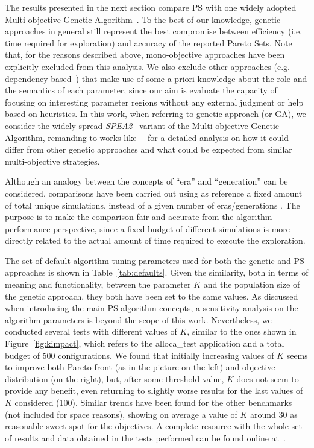 The results presented in the next section compare PS with one widely
adopted Multi-objective Genetic Algorithm~\cite{knowles_techrep06}. To
the best of our knowledge, genetic approaches in general still
represent the best compromise between efficiency (i.e. time required
for exploration) and accuracy of the reported Pareto Sets.  Note that,
for the reasons described above, mono-objective approaches have been
explicitly excluded from this analysis.  We also exclude other
approaches (e.g.  dependency based~\cite{givargis_tvlsi02}) that make
use of some a-priori knowledge about the role and the semantics of each
parameter, since our aim is evaluate the capacity of focusing on
interesting parameter regions without any external judgment or help
based on heuristics.  In this work, when referring to
genetic approach (or GA), we consider the widely spread 
\emph{SPEA2}~\cite{zitzler_eurogen01} variant of the Multi-objective
Genetic Algorithm, remanding to
works like~\cite{zitzler_ec00}~\cite{zitzler_tec03} for a detailed
analysis on how it could differ from other genetic approaches and what
could be expected from similar multi-objective strategies. 

Although an analogy between the concepts of ``era'' and ``generation''
can be considered, comparisons have been carried out using as
reference a fixed amount of total unique simulations, instead of a given
number of eras/generations . The purpose is to make the comparison
fair and accurate from the algorithm performance perspective, since a fixed budget of
different simulations is more directly related to the actual amount of time
required to execute the exploration.

The set of default algorithm tuning parameters used for both the
genetic and PS approaches is shown in
Table~\ref{tab:defaults}. Given the similarity, both in terms of
meaning and functionality, between the parameter $K$ and the population size
of the genetic approach, they both have been set to the same values. As discussed
when introducing the main PS algorithm concepts, a sensitivity analysis on the algorithm parameters is beyond the scope of this work. Nevertheless, we conducted several tests with
different values of $K$, similar to the ones shown in
Figure~\ref{fig:kimpact}, which refers to the alloca\_test application
and a total budget of 500 configurations. We found that initially increasing values
of $K$ seems to improve both Pareto front (as in the picture on the left) and objective
distribution (on the right), but, after some threshold value, $K$ does
not seem to provide any benefit, even returning to slightly worse
results for the last values of $K$ considered (100). Similar trends have been
found for the other benchmarks (not included for space reasons),
showing on average a value of $K$ around 30 as
reasonable sweet spot for the objectives. A complete resource with the
whole set of results and data obtained in the tests performed can be found online
at~\cite{ps_results}.

